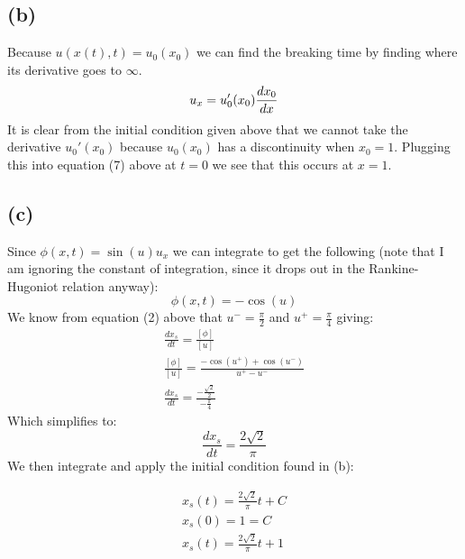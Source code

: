 \documentclass{article}
\begin{document}
\subsection*{(b)}
Because $u(x(t), t) = u_0(x_0)$ we can find the breaking time by finding where its derivative goes to $\infty$. 
\begin{equation}
u_x = u_0'(x_0)\frac{dx_0}{dx}\\
\end{equation}
It is clear from the initial condition given above that we cannot take the derivative $u_0'(x_0)$ because $u_0(x_0)$ has a discontinuity when $x_0 = 1$. Plugging this into equation (7) above at $t=0$ we see that this occurs at $x = 1$.
\subsection*{(c)}
Since $\phi(x,t) = \sin(u)u_x$ we can integrate to get the following (note that I am ignoring the constant of integration, since it drops out in the Rankine-Hugoniot relation anyway):
\begin{equation}
\phi(x, t) = -\cos(u)
\end{equation}
We know from equation (2) above that $u^- = \frac{\pi}{2}$ and $u^+ = \frac{\pi}{4}$ giving:
\begin{equation}
\begin{aligned}
\frac{dx_s}{dt} = \frac{[\phi]}{[u]}\\
\frac{[\phi]}{[u]} = \frac{-\cos(u^+) + \cos(u^-)}{u^+ - u^-}\\
\frac{dx_s}{dt} = \frac{-\frac{\sqrt{2}}{2}}{-\frac{\pi}{4}}
\end{aligned}
\end{equation}
Which simplifies to:
\begin{equation}
\frac{dx_s}{dt} = \frac{2\sqrt{2}}{\pi}
\end{equation}
We then integrate and apply the initial condition found in (b):
\begin{tcolorbox}[minipage,colback=white,arc=0pt,outer arc=0pt]
\begin{equation}
\begin{aligned}
x_s(t) = \frac{2\sqrt{2}}{\pi}t + C\\
x_s(0) = 1 = C\\
x_s(t) = \frac{2\sqrt{2}}{\pi}t + 1
\end{aligned}
\end{equation}
\end{tcolorbox}
\end{document}

